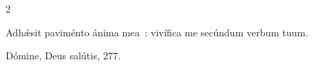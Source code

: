 \documentclass[9pt,twoside]{extarticle}
\begin{document}
\begin{multicols}{2}
%
%
%
%
%
%
%

\begin{tightlist}{}
\item {} Adhǽsit paviménto ánima mea~: vivífica me secúndum verbum tuum.
\item {} Dómine, Deus salútis, 277.
\end{tightlist}


\end{multicols}
\end{document}
